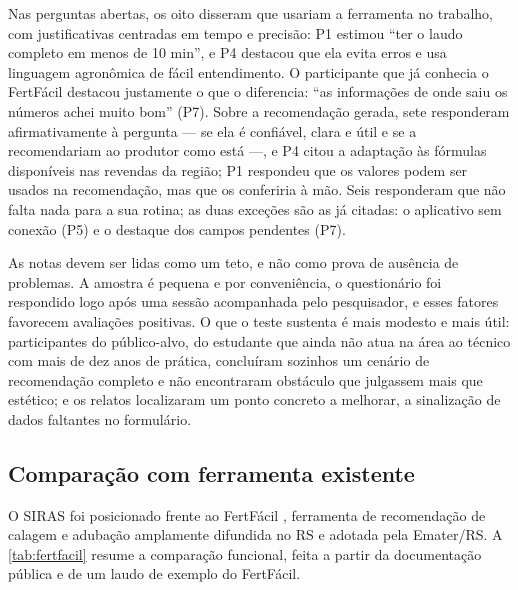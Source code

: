 Nas perguntas abertas, os oito disseram que usariam a ferramenta no trabalho, com justificativas
centradas em tempo e precisão: P1 estimou ``ter o laudo completo em menos de 10 min'', e P4
destacou que ela evita erros e usa linguagem agronômica de fácil entendimento. O participante que
já conhecia o FertFácil destacou justamente o que o diferencia: ``as informações de onde saiu os
números achei muito bom'' (P7). Sobre a recomendação gerada, sete responderam afirmativamente à
pergunta --- se ela é confiável, clara e útil e se a recomendariam ao produtor como está ---, e P4
citou a adaptação às fórmulas disponíveis nas revendas da região; P1 respondeu que os valores podem
ser usados na recomendação, mas que os conferiria à mão. Seis responderam que não falta nada para a
sua rotina; as duas exceções são as já citadas: o aplicativo sem conexão (P5) e o destaque dos
campos pendentes (P7).

As notas devem ser lidas como um teto, e não como prova de ausência de problemas. A amostra é
pequena e por conveniência, o questionário foi respondido logo após uma sessão acompanhada pelo
pesquisador, e esses fatores favorecem avaliações positivas. O que o teste sustenta é mais
modesto e mais útil: participantes do público-alvo, do estudante que ainda não atua na área ao
técnico com mais de dez anos de prática, concluíram sozinhos um cenário de recomendação completo e não encontraram obstáculo que
julgassem mais que estético; e os relatos localizaram um ponto concreto a melhorar, a
sinalização de dados faltantes no formulário.

\subsection{Comparação com ferramenta existente}\label{sec:res_comparacao}
O SIRAS foi posicionado frente ao FertFácil \citep{FertFacil2026}, ferramenta de
recomendação de calagem e adubação amplamente difundida no RS e adotada pela Emater/RS. A
\autoref{tab:fertfacil} resume a comparação funcional, feita a partir da documentação pública e de
um laudo de exemplo do FertFácil.

